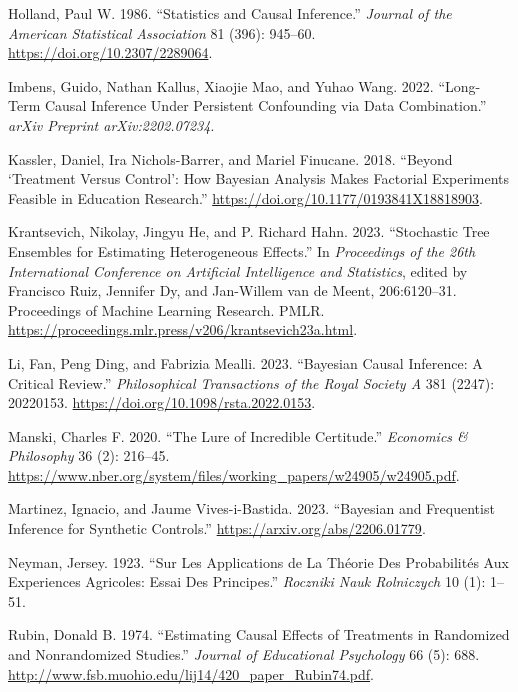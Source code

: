 \documentclass[
  letterpaper,
  DIV=11,
  numbers=noendperiod]{scrreprt}
\newlength{\cslhangindent}
\newenvironment{CSLReferences}[2] %
 {\begin{list}{}{%
  \setlength{\itemindent}{0pt}
  \setlength{\leftmargin}{0pt}
  \setlength{\parsep}{0pt}
  \ifodd #1
   \setlength{\leftmargin}{\cslhangindent}
   \setlength{\itemindent}{-1\cslhangindent}
  \fi
  \setlength{\itemsep}{#2\baselineskip}}}
 {\end{list}}
\begin{document}
\begin{CSLReferences}{1}{0}
Holland, Paul W. 1986. {``Statistics and Causal Inference.''}
\emph{Journal of the American Statistical Association} 81 (396):
945--60. \url{https://doi.org/10.2307/2289064}.

Imbens, Guido, Nathan Kallus, Xiaojie Mao, and Yuhao Wang. 2022.
{``Long-Term Causal Inference Under Persistent Confounding via Data
Combination.''} \emph{arXiv Preprint arXiv:2202.07234}.

Kassler, Daniel, Ira Nichols-Barrer, and Mariel Finucane. 2018.
{``Beyond {`Treatment Versus Control'}: How Bayesian Analysis Makes
Factorial Experiments Feasible in Education Research.''}
\url{https://doi.org/10.1177/0193841X18818903}.

Krantsevich, Nikolay, Jingyu He, and P. Richard Hahn. 2023.
{``Stochastic Tree Ensembles for Estimating Heterogeneous Effects.''} In
\emph{Proceedings of the 26th International Conference on Artificial
Intelligence and Statistics}, edited by Francisco Ruiz, Jennifer Dy, and
Jan-Willem van de Meent, 206:6120--31. Proceedings of Machine Learning
Research. PMLR.
\url{https://proceedings.mlr.press/v206/krantsevich23a.html}.

Li, Fan, Peng Ding, and Fabrizia Mealli. 2023. {``Bayesian Causal
Inference: A Critical Review.''} \emph{Philosophical Transactions of the
Royal Society A} 381 (2247): 20220153.
\url{https://doi.org/10.1098/rsta.2022.0153}.

Manski, Charles F. 2020. {``The Lure of Incredible Certitude.''}
\emph{Economics \& Philosophy} 36 (2): 216--45.
\url{https://www.nber.org/system/files/working_papers/w24905/w24905.pdf}.

Martinez, Ignacio, and Jaume Vives-i-Bastida. 2023. {``Bayesian and
Frequentist Inference for Synthetic Controls.''}
\url{https://arxiv.org/abs/2206.01779}.

Neyman, Jersey. 1923. {``Sur Les Applications de La Th{é}orie Des
Probabilit{é}s Aux Experiences Agricoles: Essai Des Principes.''}
\emph{Roczniki Nauk Rolniczych} 10 (1): 1--51.

Rubin, Donald B. 1974. {``Estimating Causal Effects of Treatments in
Randomized and Nonrandomized Studies.''} \emph{Journal of Educational
Psychology} 66 (5): 688.
\url{http://www.fsb.muohio.edu/lij14/420_paper_Rubin74.pdf}.


\end{CSLReferences}
\end{document}

